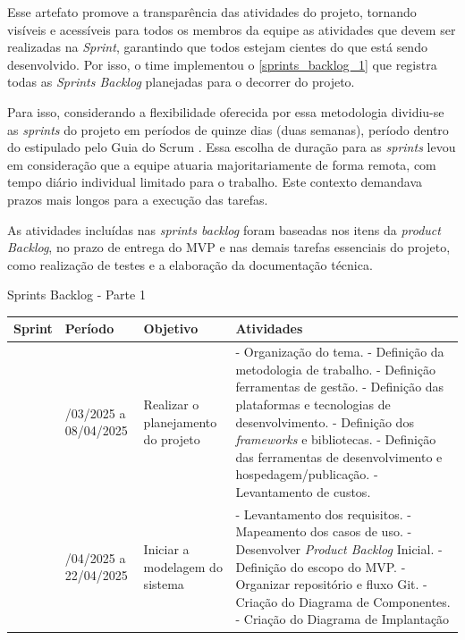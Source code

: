 \documentclass[
	12pt,				%
	openany,			%
	oneside,			%
	a4paper,			%
	english,			%
	french,				%
	spanish,			%
	brazil				%
	]{abntex2}
\begin{document}
Esse artefato promove a transparência das atividades do projeto, tornando visíveis e acessíveis para todos os membros da equipe as atividades que devem ser realizadas na \textit {Sprint}, garantindo que todos estejam cientes do que está sendo desenvolvido. Por isso, o time implementou o \autoref{sprints_backlog_1} que registra todas as \textit {Sprints Backlog} planejadas para o decorrer do projeto.

Para isso, considerando a flexibilidade oferecida por essa metodologia dividiu-se as \textit {sprints} do projeto em períodos de quinze dias (duas semanas), período dentro do estipulado pelo Guia do Scrum \cite{scrumguide}. Essa escolha de duração para as \textit {sprints} levou em consideração que a equipe atuaria majoritariamente de forma remota, com tempo diário individual limitado para o trabalho. Este contexto demandava prazos mais longos para a execução das tarefas.

As atividades incluídas nas \textit{sprints backlog} foram baseadas nos itens da \textit{product Backlog}, no prazo de entrega do MVP e nas demais tarefas essenciais do projeto, como realização de testes e a elaboração da documentação técnica. 
\\
\begin{quadro}[H]
	\caption{Sprints Backlog - Parte 1} 
	\label{sprints_backlog_1} 
\begin{tabular}{|>{\centering\arraybackslash}m{1.2cm}|>{\centering\arraybackslash}m{3cm}|>{\centering\arraybackslash}m{4.5cm}|>{\raggedright\arraybackslash}m{5.5cm}|}
		\hline
		\textbf{Sprint} & \textbf{Período} & \textbf{Objetivo} & \textbf{Atividades} \\
		\hline 
		1 & 25/03/2025 a 08/04/2025 & Realizar o planejamento do projeto  & 
		- Organização do tema. \newline - Definição da metodologia de trabalho. \newline - Definição ferramentas de gestão. \newline
		- Definição das plataformas e tecnologias de desenvolvimento. \newline  - Definição dos \textit{frameworks} e bibliotecas. \newline - Definição das ferramentas de desenvolvimento e hospedagem/publicação. \newline - Levantamento de custos. \\
		\hline
		2 & 09/04/2025 a 22/04/2025 & Iniciar a modelagem do sistema  &
		- Levantamento dos requisitos. \newline - Mapeamento dos casos de uso. \newline - Desenvolver \textit{Product Backlog} Inicial. \newline
		- Definição do escopo do MVP. \newline - Organizar repositório e fluxo Git. \newline - Criação do Diagrama de Componentes. \newline - Criação do Diagrama de Implantação \\	\hline
	\end{tabular}
\end{quadro}
\end{document}
